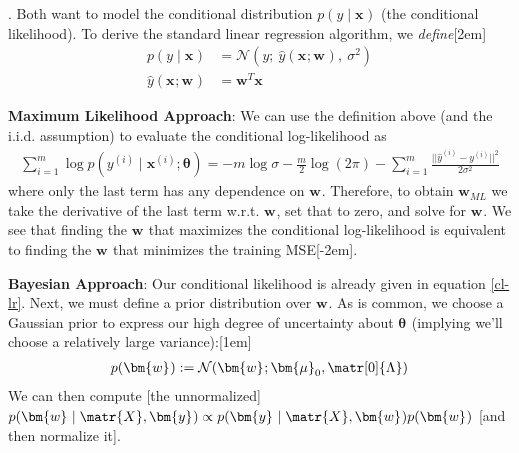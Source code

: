 \documentclass[11pt]{article}
\renewcommand\vec[2][]{\bm{#2}_{#1}}
\newcommand\myspace[1][]{\vspace{#1\bigskipamount}}
\newcommand\p{\Needspace{10\baselineskip} \noindent}
\newcommand\tlab[1]{\tag{#1}\label{#1}}
\begin{document}
\myspace
\p {}. Both want to model the conditional distribution $p(y \mid \vec{x})$ (the conditional likelihood). To derive the standard linear regression algorithm, we \textit{define}[2em]
\begin{align}
p(y \mid \vec{x}) &= \mathcal{N} \left(y; ~ \hat y(\vec{x}; \vec{w}), ~ \sigma^2 \right) \label{cl-lr}\\
\hat y(\vec{x}; \vec{w}) &= \vec{w}^T \vec{x}
\end{align}

\begin{compactitem}
	\item \textbf{Maximum Likelihood Approach}: We can use the definition above (and the i.i.d. assumption) to evaluate the conditional log-likelihood as
		\begin{align}
		\sum_{i = 1}^{m} \log p(y^{(i)} \mid \vec{x}^{(i)} ; \vec{\theta}) 
		= -m\log\sigma - \frac{m}{2} \log(2\pi) - \sum_{i = 1}^{m} \frac{|| \hat y^{(i)} - y^{(i)} ||^2}{2\sigma^2} \tlab{5.65}
		\end{align}
		where only the last term has any dependence on $\vec{w}$. Therefore, to obtain $\vec[ML]{w}$ we take the derivative of the last term w.r.t. $\vec{w}$, set that to zero, and solve for $\vec{w}$. We see that finding the $\vec{w}$ that maximizes the conditional log-likelihood is equivalent to finding the $\vec{w}$ that minimizes the training MSE. 
		
	\item \textbf{Bayesian Approach}: Our conditional likelihood is already given in equation \ref{cl-lr}. Next, we must define a prior distribution over $\vec{w}$. As is common, we choose a Gaussian prior to express our high degree of uncertainty about $\vec{\theta}$ (implying we'll choose a relatively large variance):\marginnote{Typically assume $ \matr[0]{\Lambda} = \diag{\vec[0]{\lambda}} $}[1em]
	\begin{align}
		p(\vec{w}) := \mathcal{N}(\vec{w}; \vec[0]{\mu}, \matr[0]{\Lambda} )
	\end{align}
	We can then compute [the unnormalized] $p(\vec{w} \mid \matr{X}, \vec{y}) \propto p(\vec{y} \mid \matr{X}, \vec{w}) p(\vec{w})$ [and then normalize it].
\end{compactitem}
\end{document}
